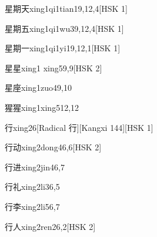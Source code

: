 \begin{entry}{星期天}{xing1qi1tian1}{9,12,4}[HSK 1]
\end{entry}

\begin{entry}{星期五}{xing1qi1wu3}{9,12,4}[HSK 1]
\end{entry}

\begin{entry}{星期一}{xing1qi1yi1}{9,12,1}[HSK 1]
\end{entry}

\begin{entry}{星星}{xing1 xing5}{9,9}[HSK 2]
\end{entry}

\begin{entry}{星座}{xing1zuo4}{9,10}
\end{entry}

\begin{entry}{猩猩}{xing1xing5}{12,12}
\end{entry}

\begin{entry}{行}{xing2}{6}[Radical 行][Kangxi 144][HSK 1]
\end{entry}

\begin{entry}{行动}{xing2dong4}{6,6}[HSK 2]
\end{entry}

\begin{entry}{行进}{xing2jin4}{6,7}
\end{entry}

\begin{entry}{行礼}{xing2li3}{6,5}
\end{entry}

\begin{entry}{行李}{xing2li5}{6,7}
\end{entry}

\begin{entry}{行人}{xing2ren2}{6,2}[HSK 2]
\end{entry}

